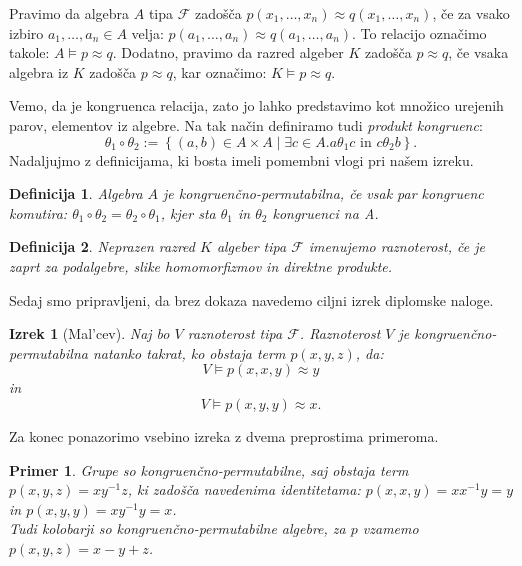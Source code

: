 \documentclass[a4paper,11pt]{article}
\newtheorem{izrek}{Izrek}
\newtheorem{definicija}{Definicija}
\newtheorem{primer}{Primer}
\begin{document}
Pravimo da algebra $A$ tipa $\mathcal{F}$ zadošča $p\left(x_1, \ldots, x_n\right)\approx q\left(x_1, \ldots, x_n\right)$,
če za vsako izbiro $a_1, \ldots, a_n \in A$ velja: $p\left(a_1, \ldots, a_n\right) \approx q\left(a_1, 
\ldots, a_n\right)$. To relacijo označimo takole: $A \models p \approx q$. Dodatno, pravimo da razred algeber $K$ 
zadošča $p \approx q$, če vsaka algebra iz $K$ zadošča $p \approx q$, kar označimo: $K \models p \approx q$.



Vemo, da je kongruenca relacija, zato jo lahko predstavimo kot množico urejenih parov, elementov iz algebre. 
Na tak način definiramo tudi \emph{produkt kongruenc}:
    $$\theta_1 \circ \theta_2 := \left\{\left(a, b\right) \in A \times A \mathrel{|} \exists c \in A. a \mathrel{\theta_1} 
    c \text{ in } c \mathrel{\theta_2} b\right\}.$$
    Nadaljujmo z definicijama, ki bosta imeli pomembni vlogi pri našem izreku.

\begin{definicija}
    Algebra $A$ je \emph{kongruenčno-permutabilna}, če vsak par kongruenc komutira: $\theta_1 \circ \theta_2 =
    \theta_2 \circ \theta_1$, kjer sta $\theta_1$ in $\theta_2$ kongruenci na A. 
\end{definicija}

\begin{definicija}
    Neprazen razred $K$ algeber tipa $\mathcal{F}$ imenujemo \emph{raznoterost}, če je zaprt za podalgebre, 
    slike homomorfizmov in direktne produkte.
\end{definicija}

Sedaj smo pripravljeni, da brez dokaza navedemo ciljni izrek diplomske naloge.

\begin{izrek}[Mal'cev] Naj bo $V$ raznoterost tipa $\mathcal{F}$. Raznoterost $V$ je kongruenčno-permutabilna
    natanko takrat, ko obstaja term $p\left(x, y, z\right)$, da: \\ $$V \models p\left(x,x,y\right)\approx y$$ 
    in $$V \models p\left(x,y,y\right)\approx x.$$   
\end{izrek}

Za konec ponazorimo vsebino izreka z dvema preprostima primeroma. \nocite{Burris_Sankappanavar_1981}

\begin{primer}
    Grupe so kongruenčno-permutabilne, saj obstaja term $p(x,y,z)=xy^{-1}z$, ki zadošča navedenima identitetama:
    $p(x,x,y)= xx^{-1}y=y$ in $p(x, y, y)=xy^{-1}y=x$.\\
    Tudi kolobarji so kongruenčno-permutabilne algebre, za $p$ vzamemo $p(x,y,z)= x-y+z$.
\end{primer}

\printbibliography
\end{document}
